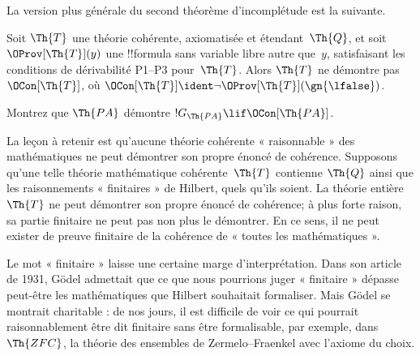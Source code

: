 \documentclass[../../../include/open-logic-section]{subfiles}
\begin{document}
La version plus générale du second théorème
d'incomplétude est la suivante.

\begin{thm}
Soit $\Th{T}$ une théorie cohérente, axiomatisée
et étendant~$\Th{Q}$, et soit
$\OProv[\Th{T}](y)$ une !!{formula} sans variable libre autre que~$y$, satisfaisant
les conditions de dérivabilité P1--P3 pour~$\Th{T}$.
Alors $\Th{T}$ ne démontre pas
$\OCon[\Th{T}]$, où
$\OCon[\Th{T}]\ident
\lnot\OProv[\Th{T}](\gn{\lfalse})$.
\end{thm}

\begin{prob}
Montrez que $\Th{PA}$ démontre
$!G_{\Th{PA}}\lif\OCon[\Th{PA}]$.
\end{prob}

\begin{digress}
La leçon à retenir est qu'aucune théorie cohérente
« raisonnable » des mathématiques ne peut démontrer
son propre énoncé de cohérence. Supposons qu'une
telle théorie mathématique cohérente~$\Th{T}$ contienne $\Th{Q}$
ainsi que les raisonnements « finitaires » de
Hilbert, quels qu'ils soient. La théorie entière
$\Th{T}$ ne peut démontrer son propre énoncé de
cohérence; à plus forte raison, sa partie finitaire
ne peut pas non plus le démontrer. En ce sens,
il ne peut exister de preuve finitaire de la
cohérence de « toutes les mathématiques ».

Le mot « finitaire » laisse une certaine marge
d'interprétation. Dans son article de 1931, Gödel
admettait que ce que nous pourrions juger
« finitaire » dépasse peut-être les mathématiques
que Hilbert souhaitait formaliser. Mais Gödel se
montrait charitable : de nos jours, il est difficile
de voir ce qui pourrait raisonnablement être dit
finitaire sans être formalisable, par exemple,
dans~$\Th{ZFC}$, la théorie des ensembles de
Zermelo--Fraenkel avec l'axiome du choix.
\end{digress}
\end{document}
